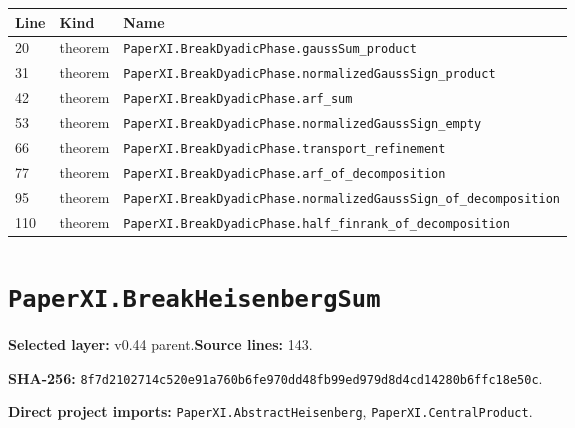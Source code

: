 \documentclass[10pt,oneside]{book}
\begin{document}
\begin{longtable}{@{}p{}p{}p{}@{}}\toprule Line&Kind&Name\\\midrule\endhead

20&theorem&\nolinkurl{PaperXI.BreakDyadicPhase.gaussSum_product}\\

31&theorem&\nolinkurl{PaperXI.BreakDyadicPhase.normalizedGaussSign_product}\\

42&theorem&\nolinkurl{PaperXI.BreakDyadicPhase.arf_sum}\\

53&theorem&\nolinkurl{PaperXI.BreakDyadicPhase.normalizedGaussSign_empty}\\

66&theorem&\nolinkurl{PaperXI.BreakDyadicPhase.transport_refinement}\\

77&theorem&\nolinkurl{PaperXI.BreakDyadicPhase.arf_of_decomposition}\\

95&theorem&\nolinkurl{PaperXI.BreakDyadicPhase.normalizedGaussSign_of_decomposition}\\

110&theorem&\nolinkurl{PaperXI.BreakDyadicPhase.half_finrank_of_decomposition}\\

\bottomrule\end{longtable}

\section{\texorpdfstring{\nolinkurl{PaperXI.BreakHeisenbergSum}}{PaperXI.BreakHeisenbergSum}}\label{module:PaperXI.BreakHeisenbergSum}

\textbf{Selected layer:} v0.44 parent.\quad\textbf{Source lines:} 143.\par\textbf{SHA-256:} {\scriptsize\nolinkurl{8f7d2102714c520e91a760b6fe970dd48fb99ed979d8d4cd14280b6ffc18e50c}}.


\textbf{Direct project imports:} \nolinkurl{PaperXI.AbstractHeisenberg}, \nolinkurl{PaperXI.CentralProduct}.
\end{document}
